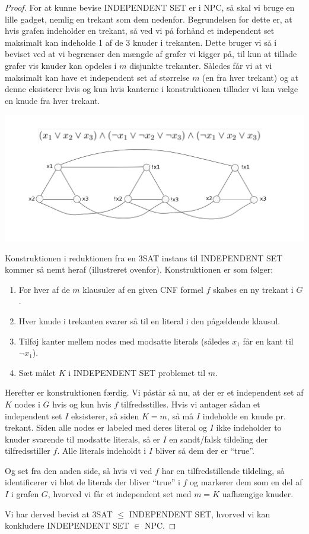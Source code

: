 \begin{proof}
 For at kunne bevise INDEPENDENT SET er i NPC, så skal vi bruge en lille
 gadget, nemlig en trekant som dem nedenfor. Begrundelsen for dette er, at hvis
 grafen indeholder en trekant, så ved vi på forhånd et independent set
 maksimalt kan indeholde 1 af de 3 knuder i trekanten. Dette bruger vi så i
 beviset ved at vi begrænser den mængde af grafer vi kigger på, til kun at
 tillade grafer vis knuder kan opdeles i $m$ disjunkte trekanter. Således får
 vi at vi maksimalt kan have et independent set af størrelse $m$ (en fra hver
 trekant) og at denne eksisterer hvis og kun hvis kanterne i konstruktionen
 tillader vi kan vælge en knude fra hver trekant.
 \begin{center}
 \includegraphics[bb=0 0 842 595,scale=0.5]{./INDEPENDENTSET.png}
\end{center}
Konstruktionen i reduktionen fra en 3SAT instans til INDEPENDENT SET kommer så
nemt heraf (illustreret ovenfor). Konstruktionen er som følger:

\begin{enumerate}
 \item For hver af de $m$ klausuler af en given CNF formel $f$ skabes en ny
	 trekant i $G$.
 \item Hver knude i trekanten svarer så til en literal i den pågældende klausul.
 \item Tilføj kanter mellem nodes med modsatte literals (således $x_1$ får en
	 kant til $\neg x_1$).
 \item Sæt målet $K$ i INDEPENDENT SET problemet til $m$.
\end{enumerate}

Herefter er konstruktionen færdig. Vi påstår så nu, at der er et independent
set af $K$ nodes i $G$ hvis og kun hvis $f$ tilfredsstilles. Hvis vi antager
sådan et independent set $I$ eksisterer, så siden $K=m$, så må $I$ indeholde en
knude pr. trekant. Siden alle nodes er labeled med deres literal og $I$ ikke
indeholder to knuder svarende til modsatte literals, så er $I$ en sandt/falsk
tildeling der tilfredsstiller $f$. Alle literals indeholdt i $I$ bliver så dem
der er ``true''.

Og set fra den anden side, så hvis vi ved $f$ har en tilfredstillende
tildeling, så identificerer vi blot de literals der bliver ``true'' i $f$ og
markerer dem som en del af $I$ i grafen $G$, hvorved vi får et independent set
med $m=K$ uafhængige knuder.

Vi har derved bevist at 3SAT $\leq$ INDEPENDENT SET, hvorved vi kan konkludere
INDEPENDENT SET $\in$ NPC.
\end{proof}

